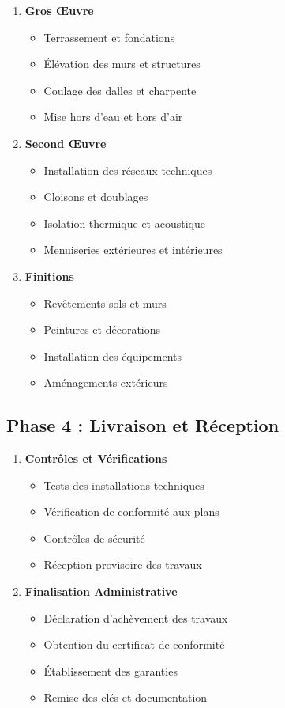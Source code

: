 \begin{enumerate}
    \item \textbf{Gros Œuvre}
    \begin{itemize}
        \item Terrassement et fondations
        \item Élévation des murs et structures
        \item Coulage des dalles et charpente
        \item Mise hors d'eau et hors d'air
    \end{itemize}
    
    \item \textbf{Second Œuvre}
    \begin{itemize}
        \item Installation des réseaux techniques
        \item Cloisons et doublages
        \item Isolation thermique et acoustique
        \item Menuiseries extérieures et intérieures
    \end{itemize}
    
    \item \textbf{Finitions}
    \begin{itemize}
        \item Revêtements sols et murs
        \item Peintures et décorations
        \item Installation des équipements
        \item Aménagements extérieurs
    \end{itemize}
\end{enumerate}

\subsection{Phase 4 : Livraison et Réception}

\begin{enumerate}
    \item \textbf{Contrôles et Vérifications}
    \begin{itemize}
        \item Tests des installations techniques
        \item Vérification de conformité aux plans
        \item Contrôles de sécurité
        \item Réception provisoire des travaux
    \end{itemize}
    
    \item \textbf{Finalisation Administrative}
    \begin{itemize}
        \item Déclaration d'achèvement des travaux
        \item Obtention du certificat de conformité
        \item Établissement des garanties
        \item Remise des clés et documentation
    \end{itemize}
\end{enumerate}

